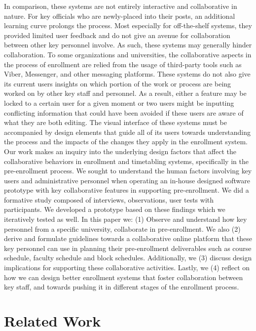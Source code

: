 In comparison, these systems are not entirely interactive and collaborative in nature. For key officials who are newly-placed into their posts, an additional learning curve prolongs the process. Most especially for off-the-shelf systems, they provided limited user feedback and do not give an avenue for collaboration between other key personnel involve. As such, these systems may generally hinder collaboration. To some organizations and universities, the collaborative aspects in the process of enrollment are relied from the usage of third-party tools such as Viber, Messenger, and other messaging platforms. These systems do not also give its current users insights on which portion of the work or process are being worked on by other key staff and personnel. As a result, either a feature may be locked to a certain user for a given moment or two users might be inputting conflicting information that could have been avoided if these users are aware of what they are both editing. The visual interface of these systems must be accompanied by design elements that guide all of its users towards understanding the process and the impacts of the changes they apply in the enrollment system. Our work makes an inquiry into the underlying design factors that affect the collaborative behaviors in enrollment and timetabling systems, specifically in the pre-enrollment process. We sought to understand the human factors involving key users and administrative personnel when operating an in-house designed software prototype with key collaborative features in supporting pre-enrollment. We did a formative study composed of interviews, observations, user tests with participants. We developed a prototype based on these findings which we iteratively tested as well. In this paper we: (1) Observe and understand how key personnel from a specific university, collaborate in pre-enrollment. We also (2) derive and formulate guidelines towards a collaborative online platform that these key personnel can use in planning their pre-enrollment deliverables such as course schedule, faculty schedule and block schedules. Additionally, we (3) discuss design implications for supporting these collaborative activities. Lastly, we (4) reflect on how we can design better enrollment systems that foster collaboration between key staff, and towards pushing it in different stages of the enrollment process. 

\section{Related Work}
